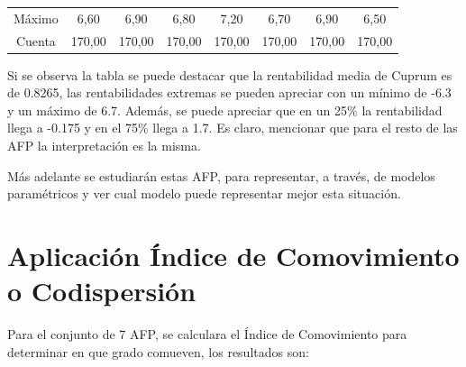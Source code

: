 \begin{center}
\begin{small}
\begin{tabular}{|l|l|l|l|l|l|l|l|}
\multicolumn{1}{|c|}{M\'aximo} & \multicolumn{1}{c|}{6,60} & \multicolumn{1}{c|}{6,90} & \multicolumn{1}{c|}{6,80} & \multicolumn{1}{c|}{7,20} & \multicolumn{1}{c|}{6,70} & \multicolumn{1}{c|}{6,90} & \multicolumn{1}{c|}{6,50} \\
\multicolumn{1}{|c|}{Cuenta} & \multicolumn{1}{c|}{170,00} & \multicolumn{1}{c|}{170,00} & \multicolumn{1}{c|}{170,00} & \multicolumn{1}{c|}{170,00} & \multicolumn{1}{c|}{170,00} & \multicolumn{1}{c|}{170,00} & \multicolumn{1}{c|}{170,00} \\
\hline
\end{tabular}
\end{small}
\end{center}

Si se observa la tabla se puede destacar que la rentabilidad media de Cuprum es de 0.8265, las rentabilidades extremas se pueden apreciar con un m\'inimo de -6.3 y un m\'aximo de 6.7. Adem\'as, se puede apreciar que en un 25$\%$ la rentabilidad llega a -0.175 y en el 75$\%$ llega a 1.7. Es claro, mencionar que para el resto de las AFP la interpretaci\'on es la misma.

M\'as adelante se estudiar\'an estas AFP, para representar, a trav\'es, de modelos param\'etricos y ver cual modelo puede representar mejor esta situaci\'on.

\section{Aplicaci\'on \'Indice de Comovimiento o Codispersi\'on}

Para el conjunto de 7 AFP, se calculara el \'Indice de Comovimiento para determinar en que grado comueven, los resultados son:

